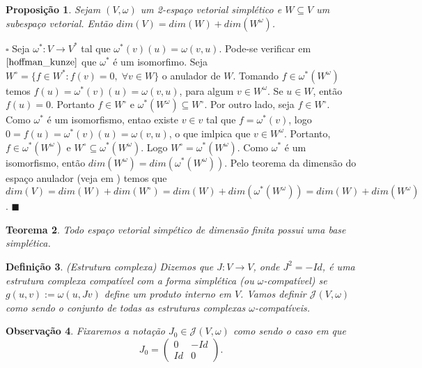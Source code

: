 \documentclass[12pt]{book}
\newtheorem{teorema}{Teorema}[section]
\newtheorem{definicao}[teorema]{Definição}
\newtheorem{observacao}[teorema]{Observação}
\newtheorem{proposicao}[teorema]{Proposição}
\newenvironment{prova}[1]{$\square$ #1}{\hfill$\blacksquare$}
\newcommand{\espacoSimpleticoOrtogonal}[1]{#1^{\omega}}
\newcommand{\estruturacomplexa}{J_{0}}
\newcommand{\estruturascomplexaspadrao}{\mathcal{J}(V, \omega)}
\newcommand{\vermelho}[1]{{\color{red}#1}}
\begin{document}
	\begin{proposicao}
		Sejam $(V,\omega)$ um 2-espaço vetorial simplético e $W \subseteq V$ um subespaço vetorial. Então $dim(V) = dim(W) + dim(\espacoSimpleticoOrtogonal{W})$.
	\end{proposicao}
	\begin{prova}
		Seja $\omega^{*}: V \to V^{*}$ tal que $\omega^{*}(v)(u) = \omega(v,u)$. Pode-se verificar em $\cite{hoffman_kunze}$ que $\omega^{*}$ é um isomorfimo. Seja $W^{\circ}=\{f\in W^{*}: f(v) = 0,\; \forall v\in W \}$ o anulador de $W$. Tomando $f \in \omega^{*}(\espacoSimpleticoOrtogonal{W})$ temos $f(u) = \omega^{*}(v)(u)=\omega(v,u)$, para algum $v \in \espacoSimpleticoOrtogonal{W}$. Se $u\in W$, então $f(u) = 0$. Portanto $f \in W^{\circ}$ e  $\omega^{*}(\espacoSimpleticoOrtogonal{W})\subseteq W^{\circ}$. Por outro lado, seja $f \in W^{\circ}$. Como $\omega^{*}$ é um isomorfismo, entao existe $v \in v$ tal que $f = \omega^{*}(v)$, logo $0=f(u) = \omega^{*}(v)(u) = \omega(v,u)$, o que imlpica que $v \in \espacoSimpleticoOrtogonal{W}$. Portanto, $f \in \omega^{*}(\espacoSimpleticoOrtogonal{W})$ e $W^{\circ} \subseteq \omega^{*}(\espacoSimpleticoOrtogonal{W})$. Logo $W^{\circ} =\omega^{*}(\espacoSimpleticoOrtogonal{W})$.
		Como $\omega^{*}$ é um isomorfismo, então $dim(\espacoSimpleticoOrtogonal{W}) = dim(\omega^{*}(\espacoSimpleticoOrtogonal{W}))$. Pelo teorema da dimensão do espaço anulador (veja em \cite{hoffman_kunze}) temos que $dim(V) = dim(W)+dim(W^{\circ}) = dim(W)+dim(\omega^{*}(\espacoSimpleticoOrtogonal{W})) = dim(W)+dim(\espacoSimpleticoOrtogonal{W})$. 
	\end{prova}
	
	\begin{teorema}
		\vermelho{Todo espaço vetorial simpético de dimensão finita possui uma base simplética.}
	\end{teorema}
	
	
	\begin{definicao}\label{definicao_estrutura_complexa}
		(Estrutura complexa) Dizemos que $J: V \to V$, onde $J^{2} = -Id$, é uma estrutura complexa compatível com a forma simplética (ou $\omega$-compatível) se $g(u,v):=\omega(u, Jv)$ define um produto interno em $V$. Vamos definir $\estruturascomplexaspadrao$ como sendo o conjunto de todas as estruturas complexas $\omega$-compatíveis.
	\end{definicao}
	
	\begin{observacao}\label{observacao_estrutura_complexa}
		Fixaremos a notação $\estruturacomplexa \in \estruturascomplexaspadrao$ como sendo o caso em que
		$$
		\estruturacomplexa=
		\left(
		\begin{array}{cc}
		0 & -Id
		\\
		Id & 0
		\end{array}
		\right).
		$$
	\end{observacao}
	
\end{document}
